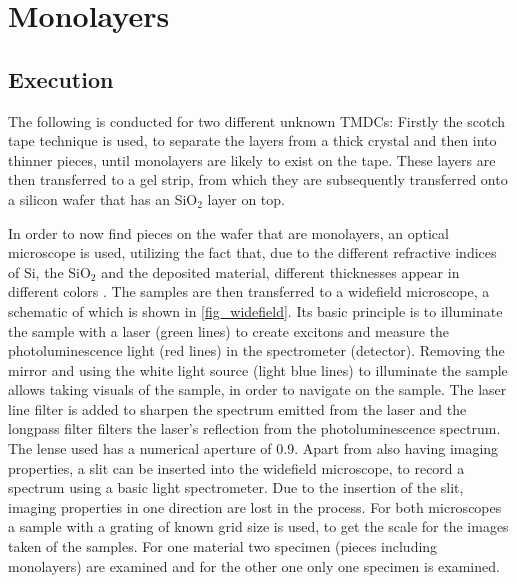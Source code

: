 \newpage
\section{Monolayers}
\label{sec:mono}

\subsection{Execution}

The following is conducted for two different unknown TMDCs:
Firstly the scotch tape technique is used, to separate the layers from a thick crystal and then into thinner pieces, until monolayers are likely to exist on the tape.
These layers are then transferred to a gel strip, from which they are subsequently transferred onto a silicon wafer that has an SiO$_2$ layer on top.

In order to now find pieces on the wafer that are monolayers, an optical microscope is used, utilizing the fact that, due to the different refractive indices of Si, the SiO$_2$ and the deposited material, different thicknesses appear in different colors \cite{benameur2011}.
The samples are then transferred to a widefield microscope, a schematic of which is shown in \cref{fig_widefield}.
Its basic principle is to illuminate the sample with a laser (green lines) to create excitons and measure the photoluminescence light (red lines) in the spectrometer (detector).
Removing the mirror and using the white light source (light blue lines) to illuminate the sample allows taking visuals of the sample, in order to navigate on the sample.
The laser line filter is added to sharpen the spectrum emitted from the laser and the longpass filter filters the laser's reflection from the photoluminescence spectrum.
The lense used has a numerical aperture of \SI{0.9}{}.
Apart from also having imaging properties, a slit can be inserted into the widefield microscope, to record a spectrum using a basic light spectrometer.
Due to the insertion of the slit, imaging properties in one direction are lost in the process.
For both microscopes a sample with a grating of known grid size is used, to get the scale for the images taken of the samples.
For one material two specimen (pieces including monolayers) are examined and for the other one only one specimen is examined.

